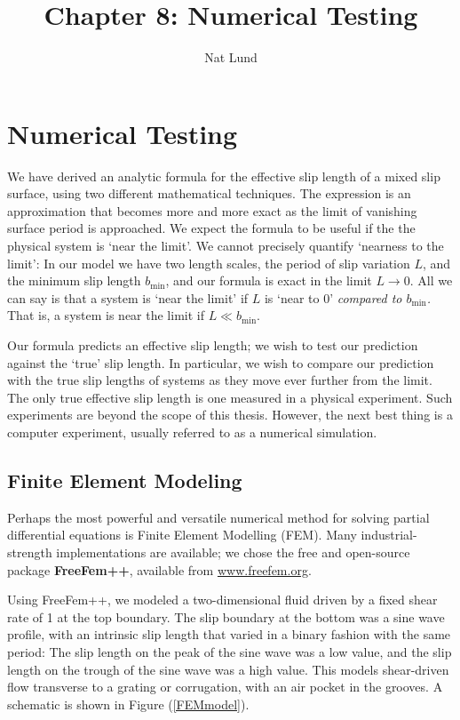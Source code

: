 \documentclass[12pt, a4paper, twoside, openright]{book}
\title{Chapter 8: Numerical Testing}
\author{Nat Lund}
\newcommand{\bmin}{\ensuremath{b_{\mathrm{min}}}}
\begin{document}
\chapter{Numerical Testing}\label{C:numerics}

We have derived an analytic formula for the effective slip length of a mixed slip surface, using two different mathematical techniques.  The expression is an approximation that becomes more and more exact as the limit of vanishing surface period is approached.  We expect the formula to be useful if the the physical system is `near the limit'.
We cannot precisely quantify `nearness to the limit': In our model we have two length scales, the period of slip variation $L$, and the minimum slip length $\bmin$, and our formula is exact in the limit $L \to 0$.  All we can say is that a system is `near the limit' if $L$ is `near to 0' \emph{compared to $\bmin$.} That is, a system is near the limit if $L \ll \bmin$.

Our formula predicts an effective slip length; we wish to test our prediction against the `true' slip length. In particular, we wish to compare our prediction with the true slip lengths of systems as they move ever further from the limit.  The only true effective slip length is one measured in a physical experiment.  Such experiments are beyond the scope of this thesis.  However, the next best thing is a computer experiment, usually referred to as a numerical simulation.

\section{Finite Element Modeling}

Perhaps the most powerful and versatile numerical method for solving partial differential equations is Finite Element Modelling (FEM).  Many industrial-strength implementations are available; we chose the free and open-source package \textbf{FreeFem++}, available from \url{www.freefem.org}.

Using FreeFem++, we modeled a two-dimensional fluid driven by a fixed shear rate of 1 at the top boundary.  The slip boundary at the bottom was a sine wave profile, with an intrinsic slip length that varied in a binary fashion with the same period: The slip length on the peak of the sine wave was a low value, and the slip length on the trough of the sine wave was a high value.  This models shear-driven flow transverse to a grating or corrugation, with an air pocket in the grooves. 
A schematic is shown in Figure (\ref{FEMmodel}).
\end{document}
